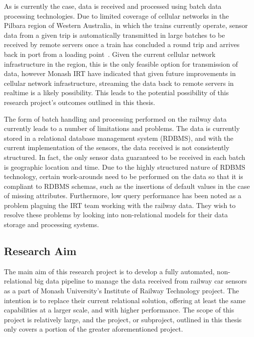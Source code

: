 As is currently the case, data is received and processed using batch data processing technologies. Due to limited coverage
of cellular networks in the Pilbara region of Western Australia, in which the trains currently operate, sensor data from
a given trip is automatically transmitted in large batches to be received by remote servers once a train has concluded a
round trip and
arrives back in port from a loading point~\cite{thomas2012taking}. Given the current cellular network infrastructure in
the region, this is the only feasible option for transmission of data, however Monash IRT have indicated that given
future improvements in cellular network infrastructure, streaming the data back to remote servers in realtime is a likely
possibility. This leads to the potential possibility of this research project's outcomes outlined in this thesis.

The form of batch handling and processing performed on the railway data currently leads to a number of limitations and
problems. The data is currently stored in a relational database management system (RDBMS), and with the current
implementation
of the sensors, the data received is not consistently structured. In fact, the only sensor data guaranteed to be received
in each batch is geographic location and time. Due to the highly structured nature of RDBMS technology, certain work-arounds
need to be performed on the data so that it is compliant to RDBMS schemas, such as the insertions of default values in
the case of missing attributes. Furthermore, low query performance has been noted as a problem plaguing the IRT team
working with the railway data. They wish to resolve these problems by looking into non-relational models for their data
storage and processing systems.





\subsection{Research Aim} %
\label{sec:objectives}

The main aim of this research project is to develop a fully automated, non-relational big data pipeline to manage
the data received from railway car sensors as a part of Monash University's Institute of Railway Technology project. The
intention is to replace their current relational solution, offering at least the same capabilities at a larger scale, and
with higher performance. The scope of this project is relatively large, and the project, or subproject, outlined in this
thesis only covers a portion of the greater aforementioned project.


